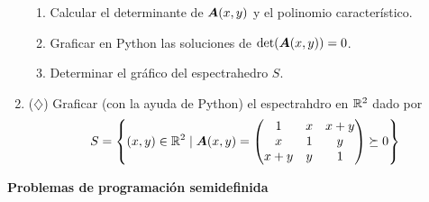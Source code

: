 \documentclass[11pt]{article}
\begin{document}
\begin{enumerate}[resume]
\begin{enumerate}
\item Calcular el determinante de $\bm{A}(x,y)$ y el polinomio característico.
\item Graficar en Python las soluciones de $\det(\bm{A}(x,y)) = 0$.
\item Determinar el gráfico del espectrahedro $S$.
\end{enumerate}

\item ($\diamondsuit$) Graficar (con la ayuda de Python) el espectrahdro en $\mathbb{R}^2$ dado por
$$S =
\left\{
(x,y) \in \mathbb{R}^2 \mid \bm{A}(x,y) = \begin{pmatrix}
1 & x & x+y \\
x & 1 & y \\
x+y & y & 1
\end{pmatrix} \succeq 0
\right\}
$$

\end{enumerate}

\noindent \textbf{Problemas de programación semidefinida}
\end{document}
